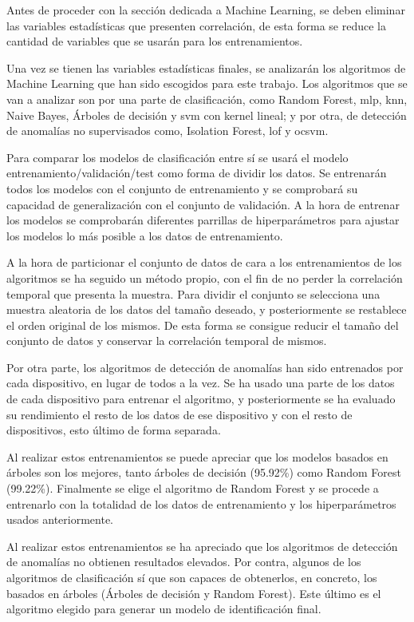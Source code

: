 Antes de proceder con la sección dedicada a Machine Learning, se deben eliminar las variables estadísticas que presenten correlación, de esta forma se reduce la cantidad de variables que se usarán para los entrenamientos.

Una vez se tienen las variables estadísticas finales, se analizarán los algoritmos de Machine Learning que han sido escogidos para este trabajo. Los algoritmos que se van a analizar son por una parte de clasificación, como Random Forest, \acrfull{mlp}, \acrfull{knn}, Naive Bayes, Árboles de decisión y \acrfull{svm} con kernel lineal; y por otra, de detección de anomalías no supervisados como, Isolation Forest, \acrfull{lof} y \acrfull{ocsvm}.

Para comparar los modelos de clasificación entre sí se usará el modelo entrenamiento/validación/test como forma de dividir los datos. Se entrenarán todos los modelos con el conjunto de entrenamiento y se comprobará su capacidad de generalización con el conjunto de validación. A la hora de entrenar los modelos se comprobarán diferentes parrillas de hiperparámetros para ajustar los modelos lo más posible a los datos de entrenamiento.

A la hora de particionar el conjunto de datos de cara a los entrenamientos de los algoritmos se ha seguido un método propio, con el fin de no perder la correlación temporal que presenta la muestra. Para dividir el conjunto se selecciona una muestra aleatoria de los datos del tamaño deseado, y posteriormente se restablece el orden original de los mismos. De esta forma se consigue reducir el tamaño del conjunto de datos y conservar la correlación temporal de mismos.

Por otra parte, los algoritmos de detección de anomalías han sido entrenados por cada dispositivo, en lugar de todos a la vez. Se ha usado una parte de los datos de cada dispositivo para entrenar el algoritmo, y posteriormente se ha evaluado su rendimiento el resto de los datos de ese dispositivo y con el resto de dispositivos, esto último de forma separada.

Al realizar estos entrenamientos se puede apreciar que los modelos basados en árboles son los mejores, tanto árboles de decisión (95.92\%) como Random Forest (99.22\%). Finalmente se elige el algoritmo de Random Forest y se procede a entrenarlo con la totalidad de los datos de entrenamiento y los hiperparámetros usados anteriormente. 

Al realizar estos entrenamientos se ha apreciado que los algoritmos de detección de anomalías no obtienen resultados elevados. Por contra, algunos de los algoritmos de clasificación sí que son capaces de obtenerlos, en concreto, los basados en árboles (Árboles de decisión y Random Forest). Este último es el algoritmo elegido para generar un modelo de identificación final.

